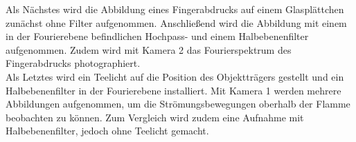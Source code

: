 Als Nächstes wird die Abbildung eines Fingerabdrucks auf einem Glasplättchen zunächst ohne Filter aufgenommen. Anschließend wird die Abbildung mit einem in der Fourierebene befindlichen Hochpass- und einem Halbebenenfilter aufgenommen. Zudem wird mit Kamera 2 das Fourierspektrum des Fingerabdrucks photographiert. \\

Als Letztes wird ein Teelicht auf die Position des Objektträgers gestellt und ein Halbebenenfilter in der Fourierebene installiert. Mit Kamera 1 werden mehrere Abbildungen aufgenommen, um die Strömungsbewegungen oberhalb der Flamme beobachten zu können. 
Zum Vergleich wird zudem eine Aufnahme mit Halbebenenfilter, jedoch ohne Teelicht gemacht. 





